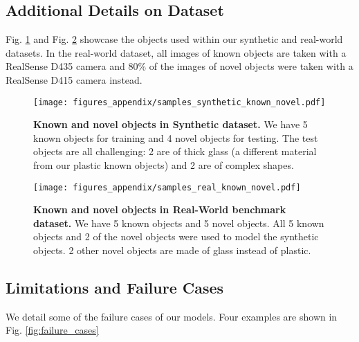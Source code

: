 \documentclass[letterpaper, 10 pt, conference]{ieeeconf}
\begin{document}
\subsection{Additional Details on Dataset}
Fig. \ref{fig:samples_datasets_syn} and Fig. \ref{fig:samples_datasets_real} showcase the objects used within our synthetic and real-world datasets. In the real-world dataset, all images of known objects are taken with a RealSense D435 camera and 80\% of the images of novel objects were taken with a RealSense D415 camera instead.

\begin{figure}[ht]
    \centering
    \texttt{[image: figures\_appendix/samples\_synthetic\_known\_novel.pdf]}
    \caption{\textbf{Known and novel objects in Synthetic dataset.} We have 5 known objects for training and 4 novel objects for testing. The test objects are all challenging: 2 are of thick glass (a different material from our plastic known objects) and 2 are of complex shapes.}
    \label{fig:samples_datasets_syn}
    \vspace{-2mm}
\end{figure}

\begin{figure}[ht]
\vspace{-1mm}
    \centering
    \texttt{[image: figures\_appendix/samples\_real\_known\_novel.pdf]}
    \caption{\textbf{Known and novel objects in Real-World benchmark dataset.} We have 5 known objects and 5 novel objects. All 5 known objects and 2 of the novel objects were used to model the synthetic objects. 2 other novel objects are made of glass instead of plastic.}
    \label{fig:samples_datasets_real}
    \vspace{-2mm}
\end{figure}


\subsection{Limitations and Failure Cases}
We detail some of the failure cases of our models. Four examples are shown in Fig. \ref{fig:failure_cases}
\end{document}
